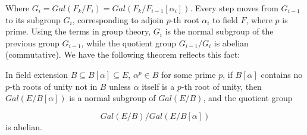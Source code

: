 \documentclass{article}
\begin{document}
Where $G_i = Gal(F_k/F_i) = Gal(F_k/F_{i-1}[\alpha_i])$. Every step moves from $G_{i-1}$ to its subgroup $G_i$, corresponding to adjoin $p$-th root $\alpha_i$ to field $F$, where $p$ is prime. Using the terms in group theory, $G_i$ is the normal subgroup of the previous group $G_{i-1}$, while the quotient group $G_{i-1}/G_i$ is abelian (commutative). We have the following theorem reflects this fact:

\begin{theorem}
In field extension $B \subseteq B[\alpha] \subseteq E$, $\alpha^p \in B$ for some prime $p$, if $B[\alpha]$ contains no $p$-th roots of unity not in $B$ unless $\alpha$ itself is a $p$-th root of unity, then $Gal(E/B[\alpha])$ is a normal subgroup of $Gal(E/B)$, and the quotient group

\[
Gal(E/B) / Gal(E/B[\alpha])
\]
is abelian.

\end{theorem}
\end{document}
